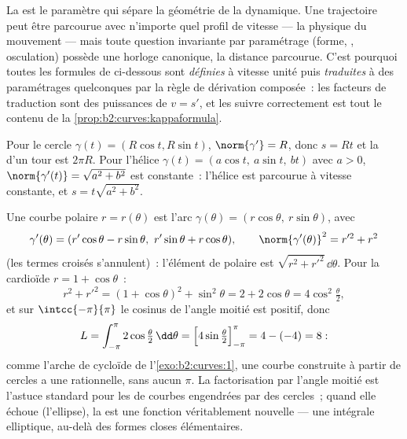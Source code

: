 \begin{remark}
La  est le paramètre qui sépare la géométrie de
la dynamique. Une trajectoire peut être parcourue avec
n'importe quel profil de vitesse --- la physique du mouvement
--- mais toute question invariante par paramétrage (forme,
, osculation) possède une horloge canonique, la
distance parcourue. C'est pourquoi toutes les formules de
 ci-dessous sont \emph{définies} à vitesse unité puis
\emph{traduites} à des paramétrages quelconques par la règle
de dérivation composée~: les facteurs de traduction sont des
puissances de $v = s'$, et les suivre correctement est tout le
contenu de la \cref{prop:b2:curves:kappaformula}.
\end{remark}

\begin{example}\label{ex:b2:curves:helix}
Pour le cercle $\gamma(t) = (R\cos t, R\sin t)$, $\norm{\gamma'} =
R$, donc $s = Rt$ et la  d'un tour  est $2\pi R$.
Pour l'hélice $\gamma(t) = (a\cos t,\ a\sin t,\ bt)$ avec $a > 0$,
$\norm{\gamma'(t)} = \sqrt{a^2 + b^2}$ est constante~: l'hélice est
parcourue à vitesse constante, et $s = t\sqrt{a^2 + b^2}$.
\end{example}

\begin{example}\label{ex:b2:curves:polarlength}
Une courbe polaire $r = r(\theta)$ est l'arc $\gamma(\theta) =
(r\cos\theta,\ r\sin\theta)$, avec
\[
\gamma'(\theta) = (r'\cos\theta - r\sin\theta,\
r'\sin\theta + r\cos\theta),
\qquad
\norm{\gamma'(\theta)}^2 = r'^2 + r^2
\]
(les termes croisés s'annulent)~: l'élément de  polaire est
$\sqrt{r^2 + r'^2}\,\dd\theta$. Pour la cardioïde $r = 1 +
\cos\theta$~:
\[
r^2 + r'^2 = (1 + \cos\theta)^2 + \sin^2\theta = 2 +
2\cos\theta = 4\cos^2\tfrac\theta2,
\]
et sur $\intcc{-\pi}{\pi}$ le cosinus de l'angle moitié est
positif, donc
\[
L = \int_{-\pi}^{\pi}2\cos\tfrac\theta2\,\dd\theta
= \Bigl[4\sin\tfrac\theta2\Bigr]_{-\pi}^{\pi}
= 4 - (-4) = 8 :
\]
comme l'arche de cycloïde de l'\cref{exo:b2:curves:1}, une courbe
construite à partir de cercles a une  rationnelle, sans
aucun $\pi$. La factorisation par l'angle moitié est l'astuce
standard pour les  de courbes engendrées par des
cercles~; quand elle échoue (l'ellipse), la \omterm{def:b2:curves:length}{longueur} est une
fonction véritablement nouvelle --- une intégrale elliptique,
au-delà des formes closes élémentaires.
\end{example}


